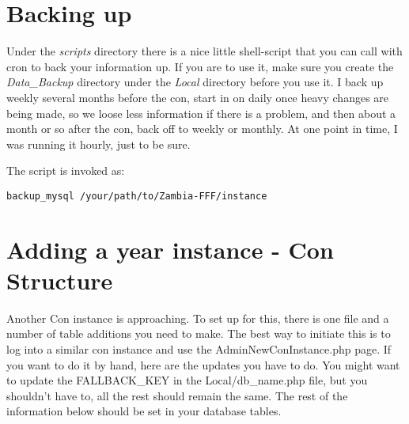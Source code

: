 \documentclass[captions=tablesignature]{scrartcl}
\begin{document}
\section{Backing up}
\label{sec-9}
Under the \emph{scripts} directory there is a nice little shell-script
that you can call with cron to back your information up.  If you are
to use it, make sure you create the \emph{Data\_Backup} directory under
the \emph{Local} directory before you use it.  I back up weekly several
months before the con, start in on daily once heavy changes are
being made, so we loose less information if there is a problem, and
then about a month or so after the con, back off to weekly or
monthly.  At one point in time, I was running it hourly, just to be
sure.

The script is invoked as:
\begin{verbatim}
backup_mysql /your/path/to/Zambia-FFF/instance
\end{verbatim}

\section{Adding a year instance - Con Structure}
\label{sec-10}
Another Con instance is approaching.  To set up for this, there is
one file and a number of table additions you need to make.  The best
way to initiate this is to log into a similar con instance and use
the AdminNewConInstance.php page.  If you want to do it by hand,
here are the updates you have to do.  You might want to update the
FALLBACK\_KEY in the Local/db\_name.php file, but you shouldn't have
to, all the rest should remain the same.  The rest of the
information below should be set in your database tables.
\end{document}
